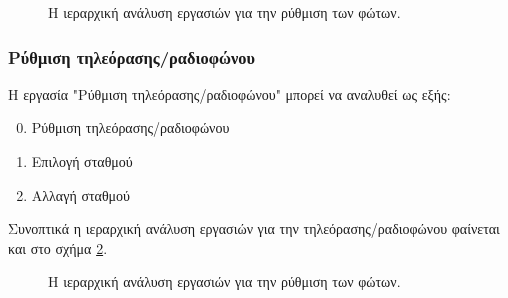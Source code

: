 \documentclass{assignment}
\begin{document}
\begin{figure}
\begin{center}
\caption{Η ιεραρχική ανάλυση εργασιών για την ρύθμιση των φώτων.}
\label{fig:task_analysis:thermansi}
\end{center}
\end{figure}

\subsubsection{Ρύθμιση τηλεόρασης/ραδιοφώνου}

Η εργασία "Ρύθμιση τηλεόρασης/ραδιοφώνου" μπορεί να αναλυθεί ως εξής:

\begin{enumerate}
\setcounter{enumi}{-1}
\item Ρύθμιση τηλεόρασης/ραδιοφώνου
\item Επιλογή σταθμού
\item Αλλαγή σταθμού
\end{enumerate}

Συνοπτικά η ιεραρχική ανάλυση εργασιών για την τηλεόρασης/ραδιοφώνου φαίνεται και στο σχήμα \ref{fig:task_analysis:tv}.

\begin{figure}
\begin{center}
\caption{Η ιεραρχική ανάλυση εργασιών για την ρύθμιση των φώτων.}
\label{fig:task_analysis:tv}
\end{center}
\end{figure}
\end{document}
